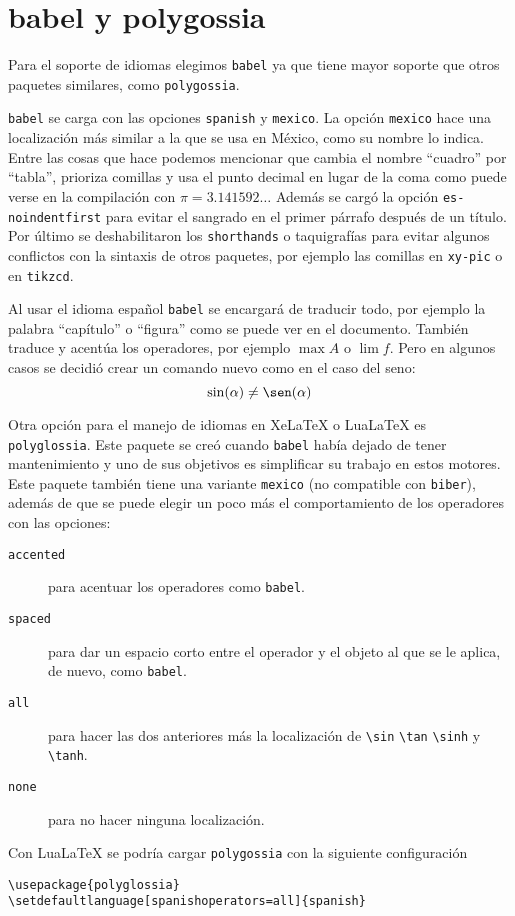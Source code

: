 \section{babel y polygossia}%
\label{sec:babel}
Para el soporte de idiomas elegimos \texttt{babel} ya que tiene mayor soporte que otros paquetes similares, como \texttt{polygossia}.

\texttt{babel} se carga con las opciones \texttt{spanish} y
\texttt{mexico}. La opción \texttt{mexico} hace una localización más similar
a la que se usa en México, como su nombre lo indica. Entre las cosas que
hace podemos mencionar que cambia el nombre \enquote{cuadro} por \enquote{tabla},
prioriza comillas y usa el punto decimal en lugar de la coma como puede
verse en la compilación con \(\pi=3.141592\ldots \) Además se
cargó la opción \texttt{es-noindentfirst} para evitar el sangrado en el
primer párrafo después de un título. Por
último se deshabilitaron los \texttt{shorthands} o taquigrafías para evitar
algunos conflictos con la sintaxis de otros paquetes, por ejemplo las
comillas en \texttt{xy-pic} o en \texttt{tikzcd}.

Al usar el idioma español \texttt{babel} se encargará de traducir todo, por
ejemplo la palabra \enquote{capítulo} o \enquote{figura} como se puede ver
en el documento. También traduce y acentúa los operadores, por ejemplo
\(\max A\) o \(\lim f\). Pero en algunos casos se decidió crear un comando
nuevo como en el caso del seno:
\[
  \sin(\alpha)\ne\sen(\alpha)
\]


Otra opción para el manejo de idiomas en Xe\LaTeX{} o Lua\LaTeX{} es
\texttt{polyglossia}. Este paquete se creó cuando \texttt{babel} había
dejado de tener mantenimiento y uno de sus objetivos es simplificar su
trabajo en estos motores. Este paquete también tiene una variante
\texttt{mexico} (no compatible con \texttt{biber}), además de que se puede
elegir un poco más el comportamiento de los operadores con las opciones:
\begin{description}
  \item[\texttt{accented}] para acentuar los operadores como \texttt{babel}.
  \item[\texttt{spaced}] para dar un espacio corto entre el operador y el objeto al que se le aplica, de nuevo, como \texttt{babel}.
  \item[\texttt{all}] para hacer las dos anteriores más la localización de \verb|\sin| \verb|\tan| \verb|\sinh| y \verb|\tanh|.
  \item[\texttt{none}] para no hacer ninguna localización.
\end{description}
Con Lua\LaTeX{} se podría cargar \texttt{polygossia} con la siguiente
configuración
\begin{flushleft}
  \verb|\usepackage{polyglossia}| \\
  \verb|\setdefaultlanguage[spanishoperators=all]{spanish}|
\end{flushleft}

